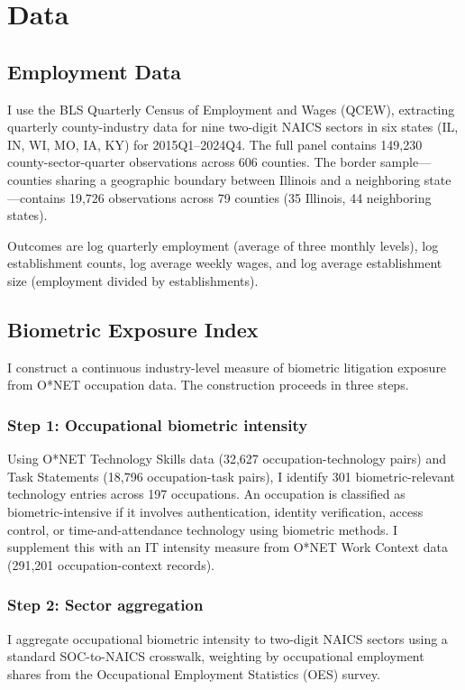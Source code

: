 \documentclass[12pt]{article}
\begin{document}
\section{Data}
\label{sec:data}

\subsection{Employment Data}

I use the BLS Quarterly Census of Employment and Wages (QCEW), extracting quarterly county-industry data for nine two-digit NAICS sectors in six states (IL, IN, WI, MO, IA, KY) for 2015Q1--2024Q4. The full panel contains 149,230 county-sector-quarter observations across 606 counties. The border sample---counties sharing a geographic boundary between Illinois and a neighboring state---contains 19,726 observations across 79 counties (35 Illinois, 44 neighboring states).

Outcomes are log quarterly employment (average of three monthly levels), log establishment counts, log average weekly wages, and log average establishment size (employment divided by establishments).

\subsection{Biometric Exposure Index}
\label{subsec:exposure}

I construct a continuous industry-level measure of biometric litigation exposure from O*NET occupation data. The construction proceeds in three steps.

\subsubsection*{Step 1: Occupational biometric intensity} Using O*NET Technology Skills data (32,627 occupation-technology pairs) and Task Statements (18,796 occupation-task pairs), I identify 301 biometric-relevant technology entries across 197 occupations. An occupation is classified as biometric-intensive if it involves authentication, identity verification, access control, or time-and-attendance technology using biometric methods. I supplement this with an IT intensity measure from O*NET Work Context data (291,201 occupation-context records).

\subsubsection*{Step 2: Sector aggregation} I aggregate occupational biometric intensity to two-digit NAICS sectors using a standard SOC-to-NAICS crosswalk, weighting by occupational employment shares from the Occupational Employment Statistics (OES) survey.
\end{document}
